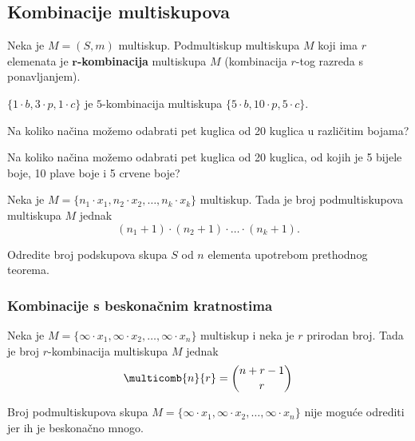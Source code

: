 \subsection{Kombinacije multiskupova}

Neka je $M = (S, m)$ multiskup.
Podmultiskup multiskupa $M$ koji ima $r$ elemenata je \textbf{$\mathbf{r}$-kombinacija} multiskupa $M$ (kombinacija $r$-tog razreda s ponavljanjem).

\begin{example}
    $\{1 \cdot b, 3 \cdot p, 1 \cdot c\}$ je $5$-kombinacija multiskupa $\{5
    \cdot b, 10 \cdot p, 5 \cdot c\}$.
\end{example}

\begin{problem}
    Na koliko načina možemo odabrati pet kuglica od 20 kuglica u različitim
    bojama?
\end{problem}

\begin{problem}
    Na koliko načina možemo odabrati pet kuglica od 20 kuglica, od kojih je 5
    bijele boje, 10 plave boje i 5 crvene boje?
\end{problem}

\begin{theorem}
    Neka je $M = \{n_1 \cdot x_1, n_2 \cdot x_2, \dots, n_k \cdot x_k\}$
    multiskup. Tada je broj podmultiskupova multiskupa $M$ jednak
    $$
        (n_1 + 1) \cdot (n_2 + 1) \cdot \dots \cdot (n_k + 1).
    $$
\end{theorem}

\begin{problem}
    Odredite broj podskupova skupa $S$ od $n$ elementa upotrebom prethodnog
    teorema.
\end{problem}

\subsubsection{Kombinacije s beskonačnim kratnostima}

\begin{theorem}
    Neka je $M=\{\infty \cdot x_1, \infty \cdot x_2, \dots, \infty \cdot x_n\}$
    multiskup i neka je $r$ prirodan broj. Tada je broj $r$-kombinacija
    multiskupa $M$ jednak
    $$
        \multicomb{n}{r} = \binom{n + r - 1}{r}
    $$
\end{theorem}

Broj podmultiskupova skupa $M=\{\infty \cdot x_1, \infty \cdot x_2, \dots,
\infty \cdot x_n\}$ nije moguće odrediti jer ih je beskonačno mnogo.

